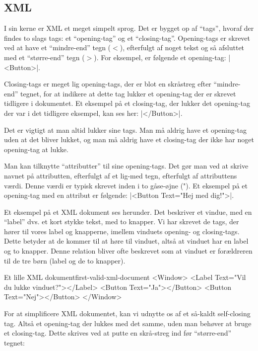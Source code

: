 \subsection{XML}
I sin kerne er XML et meget simpelt sprog. Det er bygget op af ``tags'', hvoraf 
der findes to slags tags: et ``opening-tag'' og et ``closing-tag''. 
Opening-tags er skrevet ved at have et ``mindre-end'' tegn ($<$), efterfulgt af 
noget tekst og så afsluttet med et ``større-end'' tegn ($>$). For eksempel, er 
følgende et opening-tag: \XmlInline|<Button>|.

Closing-tags er meget lig opening-tags, der er blot en skråstreg efter 
``mindre-end'' tegnet, for at indikere at dette tag lukker et opening-tag der 
er skrevet tidligere i dokumentet. Et eksempel på et closing-tag, der lukker 
det opening-tag der var i det tidligere eksempel, kan ses her: 
\XmlInline|</Button>|.

Det er vigtigt at man altid lukker sine tags. Man må aldrig have et opening-tag uden at det bliver lukket, og man må aldrig have et closing-tag der ikke har noget opening-tag at lukke.

Man kan tilknytte ``attributter'' til sine opening-tags. Det gør man ved at 
skrive navnet på attributten, efterfulgt af et lig-med tegn, efterfulgt af 
attributtens værdi. Denne værdi er typisk skrevet inden i to gåse-øjne ("). Et 
eksempel på et opening-tag med en attribut er følgende: 
\XmlInline|<Button Text="Hej med dig!">|.

Et eksempel på et XML dokument ses herunder. Det beskriver et vindue, med en 
``label'' dvs. et kort stykke tekst, med to knapper. Vi har skrevet de tags, 
der hører til vores label og knapperne, imellem vinduets opening- og 
closing-tags. Dette betyder at de kommer til at høre til vinduet, altså at 
vinduet har en label og to knapper. Denne relation bliver ofte beskrevet som at 
vinduet er forældreren til de tre børn (label og de to knapper).

\begin{example}
	\begin{XmlCode}{Et lille XML dokument}{first-valid-xml-document}
		<Window>
			<Label Text="Vil du lukke vinduet?"></Label>
			<Button Text="Ja"></Button>
			<Button Text="Nej"></Button>
		</Window>
	\end{XmlCode}
\end{example}


For at simplificere XML dokumentet, kan vi udnytte os af et så-kaldt 
self-closing tag. Altså et opening-tag der lukkes med det samme, uden man 
behøver at bruge et closing-tag. Dette skrives ved at putte en skrå-streg ind 
før ``større-end'' tegnet:

